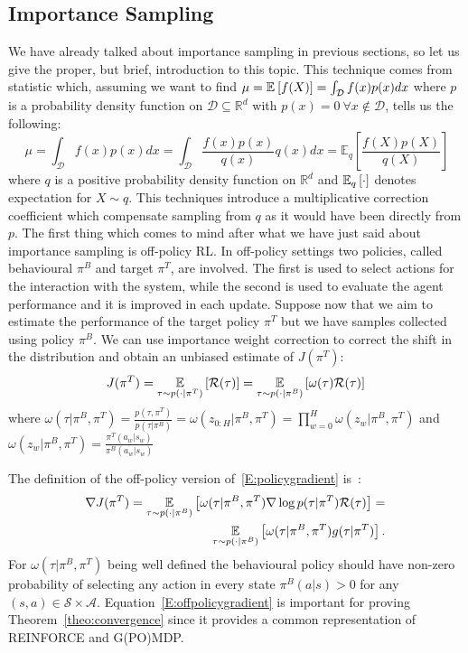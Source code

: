 \subsection{Importance Sampling}\label{subsec:is}
We have already talked about importance sampling in previous sections, so let us give the proper, but brief, introduction to this topic.\newline
This technique comes from statistic which, assuming we want to find $\mu=\EVV[]{f(X)}=\int_{\mathcal{D}}f(x)p(x)dx$ where $p$ is a probability density function on $\mathcal{D}\subseteq \mathbb{R}^d$ with $p(x)=0 ~\forall x \notin \mathcal{D}$, tells us the following:
\[
\ \mu=\int_{\mathcal{D}}f(x)p(x)dx=\int_{\mathcal{D}}\frac{f(x)p(x)}{q(x)}q(x)dx=\mathbb{E}_q\left[\frac{f(X)p(X)}{q(X)}\right]
\]
where $q$ is a positive probability density function on $\mathbb{R}^d$ and $\EVV[q]{\cdot}$ denotes expectation for $X \sim q$. This techniques introduce a multiplicative correction coefficient which compensate sampling from $q$ as it would have been directly from $p$. The first thing which comes to mind after what we have just said about importance sampling is off-policy \acs{RL}. In off-policy settings two policies, called behavioural $\pi^B$ and target $\pi^T$, are involved.
The first is used to select actions for the interaction with the system, while the second is used to evaluate the agent performance and it is improved in each update.
Suppose now that we aim to estimate the performance of the target policy $\pi^T$ but we have samples collected using policy $\pi^B$.
We can use importance weight correction to correct the shift in the distribution and obtain an unbiased estimate of $J(\pi^T)$:
\[
J(\pi^T) = \EVV[\tau \sim p(\cdot|\pi^T)]{\mathcal{R}(\tau)} = \EVV[\tau \sim p(\cdot|\pi^B)]{\omega(\tau) \mathcal{R}(\tau)}
\]
where $\omega(\tau|\pi^B,\pi^T) = \frac{p(\tau,\pi^T)}{p(\tau|\pi^B)} = \omega(z_{0:H}|\pi^B,\pi^T) = \prod_{w=0}^{H} \omega(z_w|\pi^B,\pi^T)$ and $\omega(z_w|\pi^B,\pi^T) = \frac{\pi^T(a_w|s_w)}{\pi^B(a_w|s_w)}$\newline

The definition of the off-policy version of~\eqref{E:policygradient} is~\citep[\eg][]{jurvcivcek2012reinforcement}:
\begin{eqnarray}\label{E:offpolicygradient}
\nonumber \nabla J(\pi^T) = \EVV[\tau \sim p(\cdot|\pi^B)]{\omega(\tau|\pi^B,\pi^T) \nabla \log p(\tau|\pi^T) \mathcal{R}(\tau)} =\\ \EVV[\tau \sim p(\cdot|\pi^B)]{\omega(\tau|\pi^B,\pi^T) g(\tau|\pi^T)}. 
\end{eqnarray}
For $\omega(\tau|\pi^B,\pi^T)$ being well defined the behavioural policy should have non-zero probability of selecting any action in every state \ie $\pi^B(a|s) > 0$ for any $(s,a)\in \mathcal{S} \times \mathcal{A}$.
Equation~\ref{E:offpolicygradient} is important for proving Theorem~\ref{theo:convergence} since it provides a common representation of REINFORCE and G(PO)MDP.

